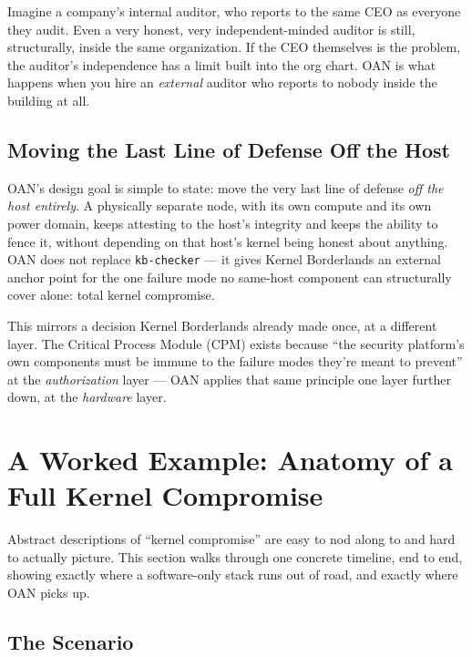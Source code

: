 \documentclass[11pt,a4paper]{article}
\begin{document}
\begin{analogybox}
Imagine a company's internal auditor, who reports to the same CEO as
everyone they audit. Even a very honest, very independent-minded
auditor is still, structurally, inside the same organization. If the
CEO themselves is the problem, the auditor's independence has a limit
built into the org chart. OAN is what happens when you hire an
\emph{external} auditor who reports to nobody inside the building at
all.
\end{analogybox}

\subsection{Moving the Last Line of Defense Off the Host}

OAN's design goal is simple to state: move the very last line of
defense \emph{off the host entirely}. A physically separate node, with
its own compute and its own power domain, keeps attesting to the
host's integrity and keeps the ability to fence it, without depending
on that host's kernel being honest about anything. OAN does not
replace \texttt{kb-checker} --- it gives Kernel Borderlands an external
anchor point for the one failure mode no same-host component can
structurally cover alone: total kernel compromise.

This mirrors a decision Kernel Borderlands already made once, at a
different layer. The Critical Process Module (CPM) exists because
``the security platform's own components must be immune to the failure
modes they're meant to prevent'' at the \emph{authorization} layer ---
OAN applies that same principle one layer further down, at the
\emph{hardware} layer.

\section{A Worked Example: Anatomy of a Full Kernel Compromise}
\label{sec:worked-example}

Abstract descriptions of ``kernel compromise'' are easy to nod along to
and hard to actually picture. This section walks through one concrete
timeline, end to end, showing exactly where a software-only stack runs
out of road, and exactly where OAN picks up.

\subsection{The Scenario}
\end{document}
